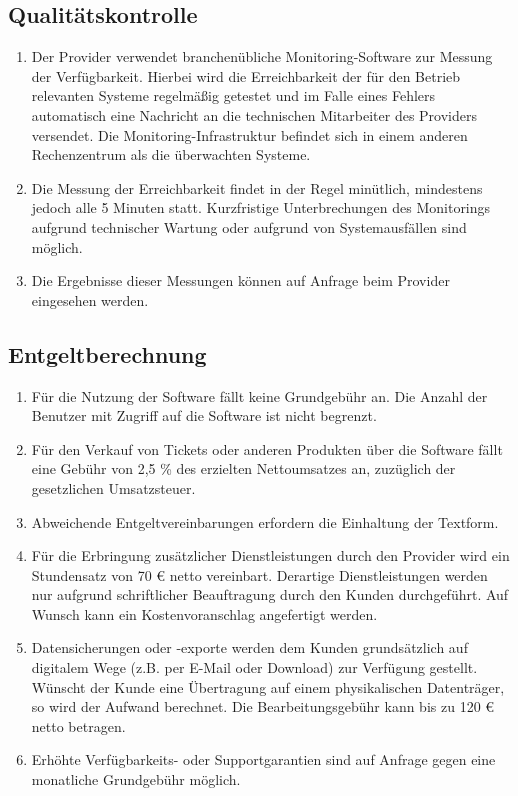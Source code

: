 \documentclass{terms}
\begin{document}
\subsection{Qualitätskontrolle}
\begin{enumerate}
\item Der Provider verwendet branchenübliche Monitoring-Software zur Messung der Verfügbarkeit. Hierbei wird die Erreichbarkeit der für den Betrieb relevanten Systeme regelmäßig getestet und im Falle eines Fehlers automatisch eine Nachricht an die technischen Mitarbeiter des Providers versendet. Die Monitoring-Infrastruktur befindet sich in einem anderen Rechenzentrum als die überwachten Systeme.
\item Die Messung der Erreichbarkeit findet in der Regel minütlich, mindestens jedoch alle 5 Minuten statt. Kurzfristige Unterbrechungen des Monitorings aufgrund technischer Wartung oder aufgrund von Systemausfällen sind möglich.
\item Die Ergebnisse dieser Messungen können auf Anfrage beim Provider eingesehen werden.
\end{enumerate}

\subsection{Entgeltberechnung}
\begin{enumerate}
\item Für die Nutzung der Software fällt keine Grundgebühr an. Die Anzahl der Benutzer mit Zugriff auf die Software ist nicht begrenzt.
\item Für den Verkauf von Tickets oder anderen Produkten über die Software fällt eine Gebühr von 2,5 \% des erzielten Nettoumsatzes an, zuzüglich der gesetzlichen Umsatzsteuer.
\item Abweichende Entgeltvereinbarungen erfordern die Einhaltung der Textform.
\item Für die Erbringung zusätzlicher Dienstleistungen durch den Provider wird ein Stundensatz von 70 € netto vereinbart. Derartige Dienstleistungen werden nur aufgrund schriftlicher Beauftragung durch den Kunden durchgeführt. Auf Wunsch kann ein Kostenvoranschlag angefertigt werden.
\item Datensicherungen oder -exporte werden dem Kunden grundsätzlich auf digitalem Wege (z.B. per E-Mail oder Download) zur Verfügung gestellt. Wünscht der Kunde eine Übertragung auf einem physikalischen Datenträger, so wird der Aufwand berechnet. Die Bearbeitungsgebühr kann bis zu 120 € netto betragen.
\item Erhöhte Verfügbarkeits- oder Supportgarantien sind auf Anfrage gegen eine monatliche Grundgebühr möglich.
\end{enumerate}
\end{document}
